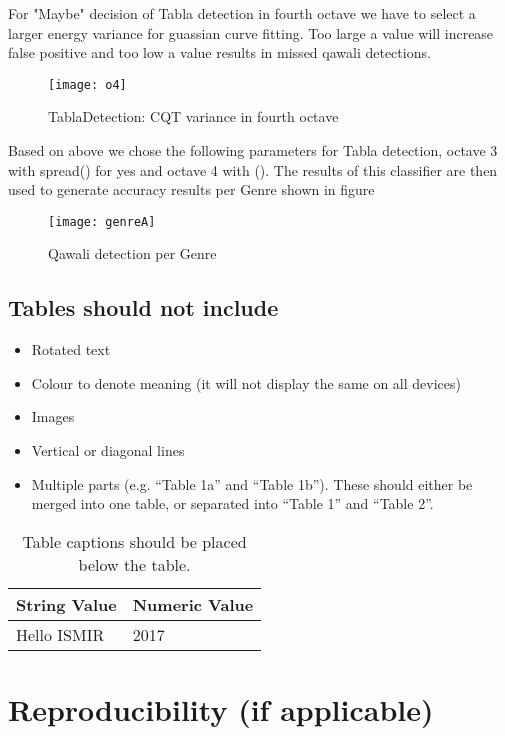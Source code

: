 \documentclass{article}
\begin{document}
For "Maybe" decision of Tabla detection in fourth octave we have to select a larger energy variance for guassian curve fitting. Too large a value will increase false positive and too low a value results in missed qawali detections.
\begin{figure}[htbp]
  \centering
  \texttt{[image: o4]}
  \caption{TablaDetection: CQT variance in fourth octave}
\label{fig:src_o4}
\end{figure}

Based on above we chose the following parameters for Tabla detection, octave 3 with spread() for yes and octave 4 with (). The results of this classifier are then used to generate accuracy results per Genre shown in figure
\begin{figure}[htbp]
  \centering
  \texttt{[image: genreA]}
  \caption{Qawali detection per Genre}
\label{fig:src_genre}
\end{figure}

\subsection{Tables should not include}

\begin{itemize}
  \item Rotated text
  \item Colour to denote meaning (it will not display the same on all devices)
  \item Images
  \item Vertical or diagonal lines
  \item Multiple parts (e.g. ``Table 1a'' and ``Table 1b'').
  These should either be merged into one table,
  or separated into ``Table 1'' and ``Table 2''.
\end{itemize}

\begin{table}[htpb]
\centering
  \begin{tabular}{ll}
  \toprule
  \bfseries String Value & \bfseries Numeric Value \\ \midrule
  Hello ISMIR  & 2017          \\
  \bottomrule
  \end{tabular}
  \caption{Table captions should be placed below the table.}
\label{tab:table}
\end{table}


\section{Reproducibility (if applicable)}
\end{document}

